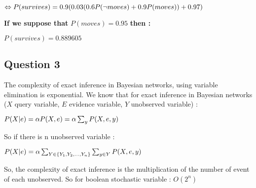 $\Leftrightarrow P(survives) = 0.9 \* (0.03 \* (0.6\*P(\lnot moves) + 0.9\*P(moves)) + 0.97)$

\textbf{If we suppose that } $P(moves) = 0.95$ \textbf{then :}

$P(survives) = 0.889605$

  \subsection{Question 3}

The complexity of exact inference in Bayesian networks, using variable elimination is exponential. We know that for exact inference in Bayesian networks ($X$ query variable, $E$ evidence variable, $Y$ unobserved variable) :

$P(X | e) = \alpha \* P(X, e) = \alpha\*\sum_{y} P(X, e, y)$

So if there is n unobserved variable :

$P(X | e) = \alpha \* \sum_{Y \in \{Y_1, Y_2, ..., Y_n\}} \sum_{y \in Y} P(X, e, y)$

So, the complexity of exact inference is the multiplication of the number of event of each unobserved. So for boolean stochastic variable : $O(2^n)$

